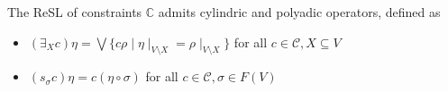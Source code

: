 \documentclass{llncs}
\def\monop{\otimes}
\def\odiv{\, {\ominus\hspace{-7.7pt} \div} \,}
\begin{document}
%
%
%
%


\begin{lemma}
	The ReSL of constraints $\mathbb{C}$ admits cylindric and polyadic operators, defined as
	\begin{itemize}
		\item  $(\exists_X c) \eta = \bigvee \{c \rho \mid \eta\mid_{V \setminus X} = \rho\mid_{V \setminus X}\}$ 
		         for all $c \in {\mathcal C}, X \subseteq V$
		\item  $(s_\sigma c) \eta = c (\eta \circ \sigma)$ for all $c \in {\mathcal C}, \sigma \in F(V)$		
	\end{itemize}
\end{lemma}
\end{document}
